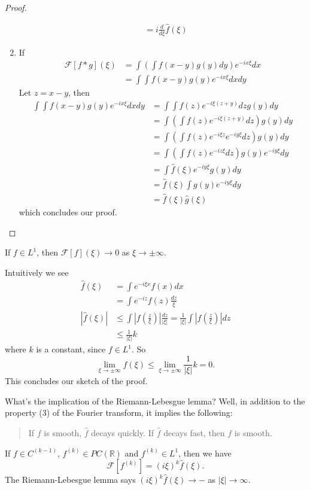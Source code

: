 \begin{proof}
\begin{enumerate}
\begin{align*}
&= i\frac{d}{d\xi}\widehat{f}(\xi)
\end{align*}
\item If 
\begin{align*}
\mathcal{F}[f*g](\xi) &= \int\left(\int f(x-y)g(y)dy\right)e^{-ix\xi}dx\\
&= \int\int f(x-y)g(y)e^{-ix\xi}dxdy
\end{align*}
Let $z=x-y$, then
\begin{align*}
\int\int f(x-y)g(y)e^{-ix\xi}dxdy&=\int\int f(z)e^{-i\xi(z+y)}dz g(y)dy\\
&=\int\left(\int f(z)e^{-i\xi(z+y)}dz\right)g(y)dy\\
&=\int\left(\int f(z)e^{-i\xi z}e^{-iy\xi}dz\right)g(y)dy\\
&=\int\left(\int f(z)e^{-iz\xi}dz\right)g(y)e^{-iy\xi}dy\\
&=\int\widehat{f}(\xi)e^{-iy\xi}g(y)dy\\
&=\widehat{f}(\xi)\int g(y)e^{-iy\xi}dy\\
&=\widehat{f}(\xi)\widehat{g}(\xi)
\end{align*}
which concludes our proof.
\end{enumerate}
\end{proof}

\begin{riemleb}
If $f\in L^{1}$, then $\mathcal{F}[f](\xi)\to0$ as $\xi\to\pm\infty$.
\end{riemleb}
\begin{sketch}
Intuitively we see
\begin{align*}
\widehat{f}(\xi) &= \int e^{-i\xi x}f(x)dx\\
&= \int e^{-iz}f(z)\frac{dz}{\xi}\\
|\widehat{f}(\xi)| &\leq
\int\left|f\left(\frac{z}{\xi}\right)\right|\frac{dz}{|\xi|}
= \frac{1}{|\xi|}\int\left|f\left(\frac{z}{\xi}\right)\right|dz\\
&\leq \frac{1}{|\xi|}k
\end{align*}
where $k$ is a constant, since $f\in L^{1}$. So
\begin{equation}
\lim_{\xi\to\pm\infty}f(\xi)\leq\lim_{\xi\to\pm\infty}\frac{1}{|\xi|}k
= 0.
\end{equation}
This concludes our sketch of the proof.
\end{sketch}
What's the implication of the Riemann-Lebesgue lemma? Well,
in addition to the property (3) of the Fourier transform, it
implies the following:
\begin{quote}
If $f$ is smooth, $\widehat{f}$ decays quickly. If
$\widehat{f}$ decays fast, then $f$ is smooth.
\end{quote}
\begin{ex}
If $f\in C^{(k-1)}$, $f^{(k)}\in PC(\mathbb{R})$ and
$f^{(k)}\in L^{1}$, then we have
\begin{equation}
\mathcal{F}[f^{(k)}] = (i\xi)^{k}\widehat{f}(\xi).
\end{equation}
The Riemann-Lebesgue lemma says
$(i\xi)^{k}\widehat{f}(\xi)\to -$ as $|\xi|\to\infty$.
\end{ex}
